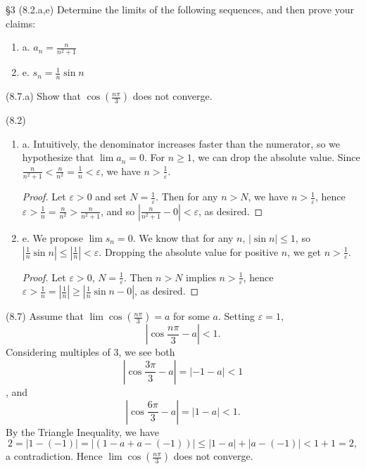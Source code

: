 \documentclass{homework}
\begin{document}
\begin{problem}{\S 3}
  (8.2.a,e) Determine the limits of the following sequences, and then prove your claims:
  \begin{enumerate}[label={}]
    \item a. $a_n=\frac{n}{n^2+1}$
    \item e. $s_n=\frac{1}{n}\sin{n}$
  \end{enumerate}
  (8.7.a) Show that $\cos{\left( \frac{n\pi}{3} \right) }$ does not converge.
\end{problem}

\begin{solution}
  (8.2)
  \begin{enumerate}[label={}]
    \item a. Intuitively, the denominator increases faster than the numerator, so we hypothesize
      that $\lim{a_n}=0$. For $n\ge 1$, we can drop the absolute value. Since
      $\frac{n}{n^2+1}<\frac{n}{n^2}=\frac{1}{n}<\varepsilon$, we have $n>\frac{1}{\varepsilon}$.
      \begin{proof}[Proof]
        Let $\varepsilon>0$ and set $N=\frac{1}{\varepsilon}$. Then for any $n>N$, we have
        $n>\frac{1}{\varepsilon}$, hence $\varepsilon>\frac{1}{n}=\frac{n}{n^2}>\frac{n}{n^2+1}$,
        and so $\left| \frac{n}{n^2+1}-0 \right| <\varepsilon$, as desired.
      \end{proof}
      
    \item e. We propose $\lim{s_n}=0$. We know that for any $n$, $\left| \sin{n} \right| \le 1$, so
      $\left| \frac{1}{n}\sin{n} \right| \le \left| \frac{1}{n} \right| <\varepsilon$. Dropping the
      absolute value for positive $n$, we get $n>\frac{1}{\varepsilon}$.
      \begin{proof}[Proof]
        Let $ \varepsilon>0$, $N=\frac{1}{\varepsilon}$. Then $n>N$ implies
        $n>\frac{1}{\varepsilon} $, hence $\varepsilon>\frac{1}{n}=\left| \frac{1}{n} \right| \ge
        \left| \frac{1}{n}\sin{n}-0 \right| $, as desired.
      \end{proof}
      
  \end{enumerate}

  (8.7) Assume that $\lim{\cos{(\frac{n\pi}{3})}}=a$ for some $a$. Setting $\varepsilon=1$, \[
    \left| \cos{\frac{n\pi}{3}}-a \right| <1
  .\]  Considering multiples of $3$, we see both \[
    \left| \cos{\frac{3\pi}{3}}-a \right| =\left| -1-a \right| <1
  \], and \[
    \left| \cos{\frac{6\pi}{3}}-a \right| =\left| 1-a \right| <1
  .\] 
  By the Triangle Inequality, we have \[
    2=\left| 1-(-1) \right| = \left| (1-a+a-(-1)) \right| \le \left| 1-a \right| +\left| a-(-1)
    \right| <1+1=2
  ,\] a contradiction. Hence $\lim{\cos{(\frac{n\pi}{3})}}$ does not converge.
\end{solution}
\end{document}
